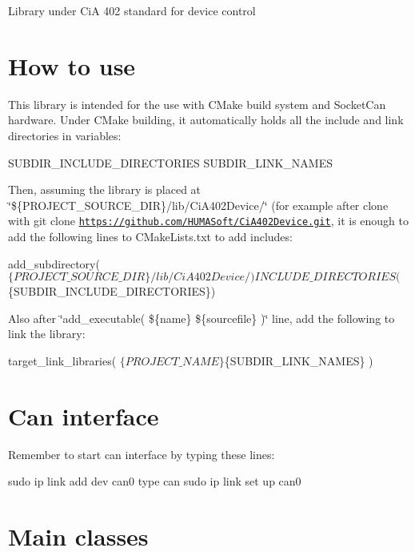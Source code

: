 Library under CiA 402 standard for device control

\section*{How to use}

This library is intended for the use with C\+Make build system and Socket\+Can hardware. Under C\+Make building, it automatically holds all the include and link directories in variables\+:


\begin{DoxyCode}
SUBDIR\_INCLUDE\_DIRECTORIES
SUBDIR\_LINK\_NAMES
\end{DoxyCode}


Then, assuming the library is placed at \char`\"{}\$\{\+P\+R\+O\+J\+E\+C\+T\+\_\+\+S\+O\+U\+R\+C\+E\+\_\+\+D\+I\+R\}/lib/\+Ci\+A402\+Device/\char`\"{} (for example after clone with {\ttfamily git clone \href{https://github.com/HUMASoft/CiA402Device.git}{\tt https\+://github.\+com/\+H\+U\+M\+A\+Soft/\+Ci\+A402\+Device.\+git}}, it is enough to add the following lines to C\+Make\+Lists.\+txt to add includes\+:


\begin{DoxyCode}
add\_subdirectory($\{PROJECT\_SOURCE\_DIR\}/lib/CiA402Device/)
INCLUDE\_DIRECTORIES($\{SUBDIR\_INCLUDE\_DIRECTORIES\})
\end{DoxyCode}


Also after \char`\"{}add\+\_\+executable( \$\{name\} \$\{sourcefile\} )\char`\"{} line, add the following to link the library\+:


\begin{DoxyCode}
target\_link\_libraries( $\{PROJECT\_NAME\} $\{SUBDIR\_LINK\_NAMES\} )
\end{DoxyCode}


\section*{Can interface}

Remember to start can interface by typing these lines\+:


\begin{DoxyCode}
sudo ip link add dev can0 type can
sudo ip link set up can0
\end{DoxyCode}


\section*{Main classes}

